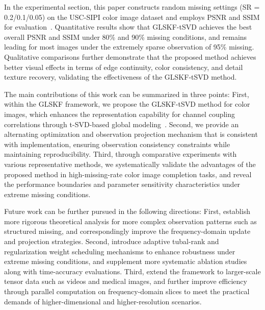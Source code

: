 \documentclass[a4paper,12pt]{article}
\numberwithin{equation}{section}
\numberwithin{algorithm}{section}
\theoremstyle{remark}
\theoremstyle{definition}
\begin{document}
In the experimental section, this paper constructs random missing settings (SR = 0.2/0.1/0.05) on the USC-SIPI color image dataset and employs PSNR and SSIM for evaluation~\cite{wang2004ssim}. Quantitative results show that GLSKF-tSVD achieves the best overall PSNR and SSIM under 80\% and 90\% missing conditions, and remains leading for most images under the extremely sparse observation of 95\% missing. Qualitative comparisons further demonstrate that the proposed method achieves better visual effects in terms of edge continuity, color consistency, and detail texture recovery, validating the effectiveness of the GLSKF-tSVD method.

The main contributions of this work can be summarized in three points: First, within the GLSKF framework, we propose the GLSKF-tSVD method for color images, which enhances the representation capability for channel coupling correlations through t-SVD-based global modeling~\cite{zhang2017tsvd}. Second, we provide an alternating optimization and observation projection mechanism that is consistent with implementation, ensuring observation consistency constraints while maintaining reproducibility. Third, through comparative experiments with various representative methods, we systematically validate the advantages of the proposed method in high-missing-rate color image completion tasks, and reveal the performance boundaries and parameter sensitivity characteristics under extreme missing conditions.

Future work can be further pursued in the following directions: First, establish more rigorous theoretical analysis for more complex observation patterns such as structured missing, and correspondingly improve the frequency-domain update and projection strategies. Second, introduce adaptive tubal-rank and regularization weight scheduling mechanisms to enhance robustness under extreme missing conditions, and supplement more systematic ablation studies along with time-accuracy evaluations. Third, extend the framework to larger-scale tensor data such as videos and medical images, and further improve efficiency through parallel computation on frequency-domain slices to meet the practical demands of higher-dimensional and higher-resolution scenarios.









\end{document}
